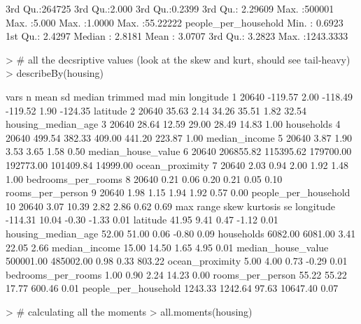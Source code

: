 \documentclass{article}
\begin{document}
\begin{Schunk}
\begin{Soutput}
 3rd Qu.:264725     3rd Qu.:2.000   3rd Qu.:0.2399     3rd Qu.: 2.29609  
 Max.   :500001     Max.   :5.000   Max.   :1.0000     Max.   :55.22222  
 people_per_household
 Min.   :   0.6923   
 1st Qu.:   2.4297   
 Median :   2.8181   
 Mean   :   3.0707   
 3rd Qu.:   3.2823   
 Max.   :1243.3333   
\end{Soutput}
\begin{Sinput}
> # all the decsriptive values (look at the skew and kurt, should see tail-heavy)
> describeBy(housing)
\end{Sinput}
\begin{Soutput}
                     vars     n      mean        sd    median   trimmed       mad      min
longitude               1 20640   -119.57      2.00   -118.49   -119.52      1.90  -124.35
latitude                2 20640     35.63      2.14     34.26     35.51      1.82    32.54
housing_median_age      3 20640     28.64     12.59     29.00     28.49     14.83     1.00
households              4 20640    499.54    382.33    409.00    441.20    223.87     1.00
median_income           5 20640      3.87      1.90      3.53      3.65      1.58     0.50
median_house_value      6 20640 206855.82 115395.62 179700.00 192773.00 101409.84 14999.00
ocean_proximity         7 20640      2.03      0.94      2.00      1.92      1.48     1.00
bedrooms_per_rooms      8 20640      0.21      0.06      0.20      0.21      0.05     0.10
rooms_per_person        9 20640      1.98      1.15      1.94      1.92      0.57     0.00
people_per_household   10 20640      3.07     10.39      2.82      2.86      0.62     0.69
                           max     range  skew kurtosis     se
longitude              -114.31     10.04 -0.30    -1.33   0.01
latitude                 41.95      9.41  0.47    -1.12   0.01
housing_median_age       52.00     51.00  0.06    -0.80   0.09
households             6082.00   6081.00  3.41    22.05   2.66
median_income            15.00     14.50  1.65     4.95   0.01
median_house_value   500001.00 485002.00  0.98     0.33 803.22
ocean_proximity           5.00      4.00  0.73    -0.29   0.01
bedrooms_per_rooms        1.00      0.90  2.24    14.23   0.00
rooms_per_person         55.22     55.22 17.77   600.46   0.01
people_per_household   1243.33   1242.64 97.63 10647.40   0.07
\end{Soutput}
\begin{Sinput}
> # calculating all the moments
> all.moments(housing)
\end{Sinput}
\begin{Soutput}
           [,1]       [,2]      [,3]        [,4]      [,5]         [,6]     [,7]      [,8]

\end{Soutput}
\end{Schunk}
\end{document}

